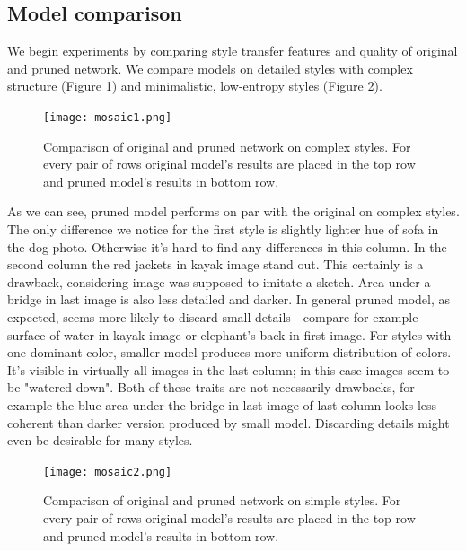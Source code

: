 \documentclass[../Main.tex]{subfiles}
\begin{document}
\subsection{Model comparison}
We begin experiments by comparing style transfer features and quality of
original and pruned network. We compare models on detailed styles with complex 
structure (Figure \ref{fig:mosaic1}) and minimalistic, low-entropy styles 
(Figure \ref{fig:mosaic2}). 
        \begin{figure}[h!]
        \centering
            \texttt{[image: mosaic1.png]}
            \caption{Comparison of original and pruned network on complex styles. 
            For every pair of rows original model's results are placed in the
            top row and pruned model's results in bottom row.
            }
            \label{fig:mosaic1}
        \end{figure}
As we can see, pruned model performs on par with the original on complex styles.
The only difference we notice for the first style is slightly lighter hue of sofa
in the dog photo. Otherwise it's hard to find any differences in this column.
In the second column the red jackets in kayak image stand out. This certainly is a drawback,
considering image was supposed to imitate a sketch. Area under a bridge in last 
image is also less detailed and darker. In general pruned model, as expected,
seems more likely to discard small details - compare for example surface of water in kayak image
or elephant's back in first image. For styles with one dominant color, smaller
model produces more uniform distribution of colors. It's visible in virtually
all images in the last column; in this case images seem to be "watered down".
Both of these traits are not necessarily drawbacks, for example the blue area
under the bridge in last image of last column looks less coherent than darker version
produced by small model. Discarding details might even be desirable for many styles.

        \begin{figure}[h!]
        \centering
            \texttt{[image: mosaic2.png]}
            \caption{Comparison of original and pruned network on simple styles. 
            For every pair of rows original model's results are placed in the
            top row and pruned model's results in bottom row.
            }
            \label{fig:mosaic2}
        \end{figure} 
 
\end{document}
